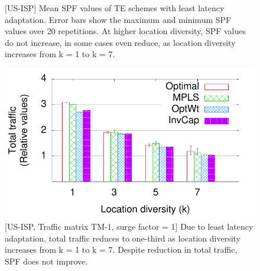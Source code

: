 \begin{figure}[t]
\begin{center}
 \end{center}
 \vspace{-0.2in}
\caption{[US-ISP] Mean SPF values of TE schemes with least latency adaptation. Error bars show the maximum and minimum SPF values over 20 repetitions. At higher location diversity, SPF values do not increase, in some cases even reduce, as location diversity increases from k = 1 to k = 7.}
\vspace{-0.2in}
\label{fig:leastlatspf}
\end{figure}


\begin{figure}[t] 
\begin{center}
\includegraphics[scale=0.5]{newimages/ATT2/TM27_totalTraffic.pdf}
\end{center}
\vspace{-0.2in}
\caption{[US-ISP, Traffic matrix TM-1, surge factor = 1]  Due to least latency adaptation, total traffic reduces to one-third as location diversity increases from k = 1 to k = 7.  Despite reduction in total traffic, SPF does not improve.}
\vspace{-0.2in}
\label{fig:totaltraffic}
\end{figure}



